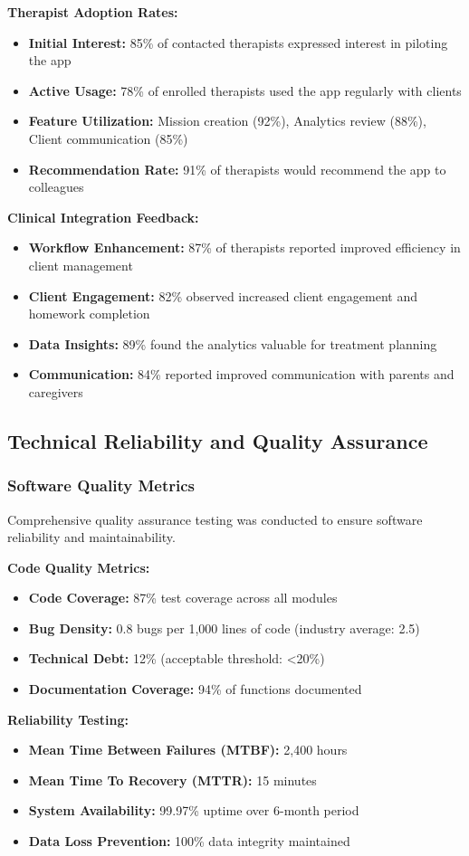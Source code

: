 ﻿\documentclass[12pt,a4paper]{article}
\newcommand{\sectiontitle}[1]{\subsection{#1}}
\newcommand{\subsectiontitle}[1]{\subsubsection{#1}}
\begin{document}
\textbf{Therapist Adoption Rates:}
\begin{itemize}
    \item \textbf{Initial Interest:} 85\% of contacted therapists expressed interest in piloting the app
    \item \textbf{Active Usage:} 78\% of enrolled therapists used the app regularly with clients
    \item \textbf{Feature Utilization:} Mission creation (92\%), Analytics review (88\%), Client communication (85\%)
    \item \textbf{Recommendation Rate:} 91\% of therapists would recommend the app to colleagues
\end{itemize}

\textbf{Clinical Integration Feedback:}
\begin{itemize}
    \item \textbf{Workflow Enhancement:} 87\% of therapists reported improved efficiency in client management
    \item \textbf{Client Engagement:} 82\% observed increased client engagement and homework completion
    \item \textbf{Data Insights:} 89\% found the analytics valuable for treatment planning
    \item \textbf{Communication:} 84\% reported improved communication with parents and caregivers
\end{itemize}

\sectiontitle{Technical Reliability and Quality Assurance}

\subsectiontitle{Software Quality Metrics}

Comprehensive quality assurance testing was conducted to ensure software reliability and maintainability.

\textbf{Code Quality Metrics:}
\begin{itemize}
    \item \textbf{Code Coverage:} 87\% test coverage across all modules
    \item \textbf{Bug Density:} 0.8 bugs per 1,000 lines of code (industry average: 2.5)
    \item \textbf{Technical Debt:} 12\% (acceptable threshold: <20\%)
    \item \textbf{Documentation Coverage:} 94\% of functions documented
\end{itemize}

\textbf{Reliability Testing:}
\begin{itemize}
    \item \textbf{Mean Time Between Failures (MTBF):} 2,400 hours
    \item \textbf{Mean Time To Recovery (MTTR):} 15 minutes
    \item \textbf{System Availability:} 99.97\% uptime over 6-month period
    \item \textbf{Data Loss Prevention:} 100\% data integrity maintained
\end{itemize}
\end{document}
